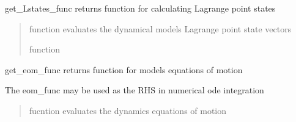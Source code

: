 \documentclass[letterpaper,10pt,english]{sphinxmanual}
\begin{document}
\begin{fulllineitems}
\begin{fulllineitems}
\begin{quote}
\begin{description}
\end{description}\end{quote}

\end{fulllineitems}


\begin{fulllineitems}
\label{\detokenize{models:pyraa.models.Models.get_Lstates_func}}
\pysigstartsignatures
{}
\pysigstopsignatures
\sphinxAtStartPar
get\_Lstates\_func \sphinxhyphen{} returns function for calculating Lagrange point states
\begin{quote}\begin{description}
\sphinxAtStartPar
{} \sphinxhyphen{}\sphinxhyphen{} 

\sphinxAtStartPar
{} \sphinxhyphen{}\sphinxhyphen{} function evaluates the dynamical model\textquotesingle{}s Lagrange point state vectors

\sphinxAtStartPar
function

\end{description}\end{quote}

\end{fulllineitems}


\begin{fulllineitems}
\label{\detokenize{models:pyraa.models.Models.get_eom_func}}
\pysigstartsignatures
{}
\pysigstopsignatures
\sphinxAtStartPar
get\_eom\_func \sphinxhyphen{} returns function for model\textquotesingle{}s equations of motion

\sphinxAtStartPar
The eom\_func may be used as the RHS in numerical ode integration
\begin{quote}\begin{description}
\sphinxAtStartPar
{} \sphinxhyphen{}\sphinxhyphen{} 

\sphinxAtStartPar
{} \sphinxhyphen{}\sphinxhyphen{} fucntion evaluates the dynamic\textquotesingle{}s equations of motion


\end{description}
\end{quote}
\end{fulllineitems}
\end{fulllineitems}
\end{document}
